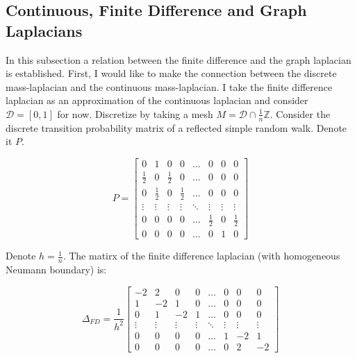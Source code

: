 \documentclass[paper=a4, fontsize=11pt]{scrartcl} %
\numberwithin{equation}{section} %
\numberwithin{figure}{section} %
\numberwithin{table}{section} %
\newcommand{\dom}{\mathcal{D}}
\begin{document}
\subsection{Continuous, Finite Difference and Graph Laplacians}
In this subsection a relation between the finite difference and the graph
laplacian is established.
First, I would like to make the connection between the discrete mass-laplacian and the
continuous mass-laplacian. I take the finite difference laplacian as an 
approximation of the continuous laplacian and consider $\dom =[0,1]$  
for now. Discretize by taking a mesh $M = \dom \cap \frac{1}{n} \mathbb{Z}$.
Consider the discrete transition probability matrix of a reflected simple random walk. 
Denote it $P$.

\[
P =
\begin{bmatrix}
  0            & 1            & 0           & 0              & \dots       & 0             & 0      &0            \\
  \frac{1}{2}  & 0            & \frac{1}{2} & 0              & \dots       & 0             & 0      &0            \\   
  0            & \frac{1}{2}  & 0           & \frac{1}{2}    & \dots       & 0             & 0      &0            \\ 
  \vdots       & \vdots       & \vdots      & \vdots         & \ddots      & \vdots        & \vdots &\vdots       \\
  0            & 0            & 0           &0               & \dots       & \frac{1}{2}   & 0      &\frac{1}{2}  \\
  0            & 0            & 0           &0               & \dots       & 0             & 1      &0            
\end{bmatrix}
\]

Denote $h = \frac{1}{n}$. The matirx of the finite difference
laplacian (with homogeneous Neumann boundary) is:

\[
\Delta_{FD} = \frac{1}{h^2}
\begin{bmatrix}
  -2           & 2           & 0           & 0              & \dots       & 0             & 0      &0            \\
  1            & -2           & 1           & 0              & \dots       & 0             & 0      &0            \\   
  0            & 1            & -2          & 1              & \dots       & 0             & 0      &0            \\ 
  \vdots       & \vdots       & \vdots      & \vdots         & \ddots      & \vdots        & \vdots &\vdots       \\
  0            & 0            & 0           &0               & \dots       & 1             & -2     &1            \\
  0            & 0            & 0           &0               & \dots       & 0             & 2      &-2           
\end{bmatrix}
\]
\end{document}

